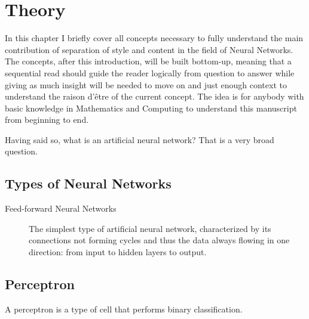 
\chapter{Theory}
\label{sec:concepts}


In this chapter I briefly cover all concepts necessary to fully understand the main contribution of separation of style and content in the field of Neural Networks.
The concepts, after this introduction, will be built bottom-up, meaning that a sequential read should guide the reader logically from question to answer while giving as much insight will be needed to move on and just enough context to understand the raison d'être of the current concept.
The idea is for anybody with basic knowledge in Mathematics and Computing to understand this manuscript from beginning to end.

Having said so, what is an artificial neural network?
That is a very broad question.




\section{Types of Neural Networks}
\label{sec:Types of Neural Networks}

\begin{description}
  \item[Feed-forward Neural Networks]
  The simplest type of artificial neural network, characterized by its connections not forming cycles and thus the data always flowing in one direction: from input to hidden layers to output.
\end{description}



\section{Perceptron}
\label{sec:Perceptron}
A perceptron is a type of cell that performs binary classification.

